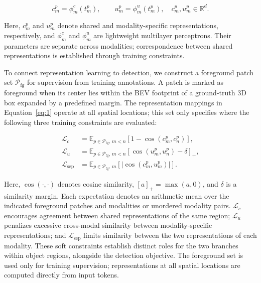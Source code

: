 \begin{equation}
c_m^p=\phi_m^{c}(t_m^p),\qquad
u_m^p=\phi_m^{u}(t_m^p),
\quad c_m^p,u_m^p\in\mathbb R^d.
\label{eq:1}
\end{equation}

Here, \(c_m^p\) and \(u_m^p\) denote shared and modality-specific representations, respectively, and \(\phi_m^c\) and \(\phi_m^u\) are lightweight multilayer perceptrons. Their parameters are separate across modalities; correspondence between shared representations is established through training constraints.

To connect representation learning to detection, we construct a foreground patch set \(\mathcal P_{\mathrm{fg}}\) for supervision from training annotations. A patch is marked as foreground when its center lies within the BEV footprint of a ground-truth 3D box expanded by a predefined margin. The representation mappings in Equation~\eqref{eq:1} operate at all spatial locations; this set only specifies where the following three training constraints are evaluated:

\begin{equation}
\begin{aligned}
\mathcal L_c
&=\mathbb E_{p\in\mathcal P_{\mathrm{fg}},\,m<n}
\left[1-\operatorname{cos}(c_m^p,c_n^p)\right],\\
\mathcal L_u
&=\mathbb E_{p\in\mathcal P_{\mathrm{fg}},\,m<n}
\left[\operatorname{cos}(u_m^p,u_n^p)-\delta\right]_+,\\
\mathcal L_{\mathrm{sep}}
&=\mathbb E_{p\in\mathcal P_{\mathrm{fg}},\,m}
\left[\left|\operatorname{cos}(c_m^p,u_m^p)\right|\right].
\end{aligned}
\label{eq:2}
\end{equation}

Here, \(\operatorname{cos}(\cdot,\cdot)\) denotes cosine similarity, \([a]_+=\max(a,0)\), and \(\delta\) is a similarity margin. Each expectation denotes an arithmetic mean over the indicated foreground patches and modalities or unordered modality pairs. \(\mathcal L_c\) encourages agreement between shared representations of the same region; \(\mathcal L_u\) penalizes excessive cross-modal similarity between modality-specific representations; and \(\mathcal L_{\mathrm{sep}}\) limits similarity between the two representations of each modality. These soft constraints establish distinct roles for the two branches within object regions, alongside the detection objective. The foreground set is used only for training supervision; representations at all spatial locations are computed directly from input tokens.

